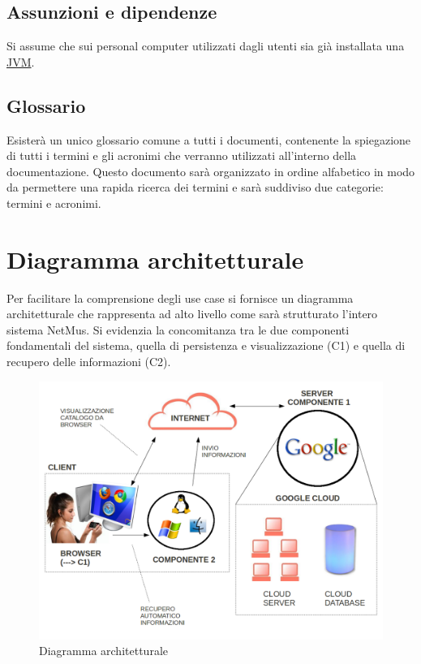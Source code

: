 \section{Assunzioni e dipendenze}
Si assume che sui personal computer utilizzati dagli utenti sia gi\`a installata
una \underline{JVM}.

\section{Glossario}
Esister\`a un unico glossario comune a tutti i documenti, contenente la
spiegazione di tutti i termini e gli acronimi che verranno utilizzati
all'interno della documentazione. Questo documento sar\`a organizzato in ordine
alfabetico in modo da permettere una rapida ricerca dei termini e sar\`a suddiviso
due categorie: termini e acronimi.

\chapter{Diagramma architetturale}
\thispagestyle{fancy}
Per facilitare la comprensione degli use case si fornisce un diagramma
architetturale che rappresenta ad alto livello come sar\`a strutturato l'intero
sistema NetMus. Si evidenzia la concomitanza tra le due componenti fondamentali
del sistema, quella di persistenza e visualizzazione (C1) e quella di
recupero delle informazioni (C2).
\vspace{1cm}

\begin{figure}[h]
  \centering
  \includegraphics[width=16cm]{img/AR/DiagrammaArchitetturale.png}
\caption{Diagramma architetturale}
\end{figure}

